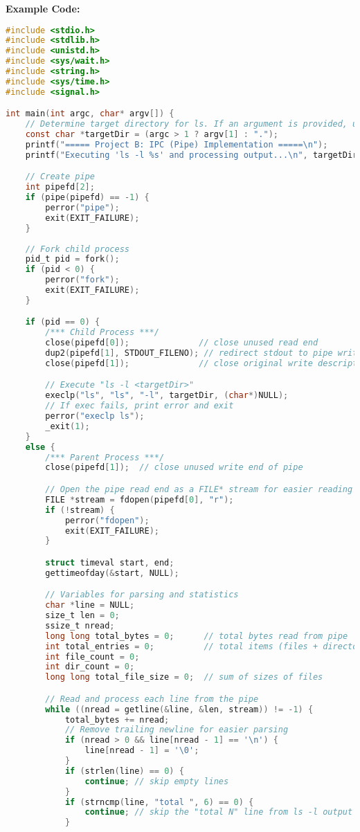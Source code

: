 \documentclass[11pt]{article}
\begin{document}
\textbf{Example Code:}
\begin{lstlisting}[language=C]
#include <stdio.h>
#include <stdlib.h>
#include <unistd.h>
#include <sys/wait.h>
#include <string.h>
#include <sys/time.h>
#include <signal.h>

int main(int argc, char* argv[]) {
    // Determine target directory for ls. If an argument is provided, use it; otherwise use current directory.
    const char *targetDir = (argc > 1 ? argv[1] : ".");
    printf("===== Project B: IPC (Pipe) Implementation =====\n");
    printf("Executing 'ls -l %s' and processing output...\n", targetDir);

    // Create pipe
    int pipefd[2];
    if (pipe(pipefd) == -1) {
        perror("pipe");
        exit(EXIT_FAILURE);
    }
    
    // Fork child process
    pid_t pid = fork();
    if (pid < 0) {
        perror("fork");
        exit(EXIT_FAILURE);
    }

    if (pid == 0) {
        /*** Child Process ***/
        close(pipefd[0]);              // close unused read end
        dup2(pipefd[1], STDOUT_FILENO); // redirect stdout to pipe write end
        close(pipefd[1]);              // close original write descriptor

        // Execute "ls -l <targetDir>"
        execlp("ls", "ls", "-l", targetDir, (char*)NULL);
        // If exec fails, print error and exit
        perror("execlp ls");
        _exit(1);
    } 
    else {
        /*** Parent Process ***/
        close(pipefd[1]);  // close unused write end of pipe

        // Open the pipe read end as a FILE* stream for easier reading
        FILE *stream = fdopen(pipefd[0], "r");
        if (!stream) {
            perror("fdopen");
            exit(EXIT_FAILURE);
        }

        struct timeval start, end;
        gettimeofday(&start, NULL);

        // Variables for parsing and statistics
        char *line = NULL;
        size_t len = 0;
        ssize_t nread;
        long long total_bytes = 0;      // total bytes read from pipe
        int total_entries = 0;          // total items (files + directories)
        int file_count = 0;
        int dir_count = 0;
        long long total_file_size = 0;  // sum of sizes of files

        // Read and process each line from the pipe
        while ((nread = getline(&line, &len, stream)) != -1) {
            total_bytes += nread;
            // Remove trailing newline for easier parsing
            if (nread > 0 && line[nread - 1] == '\n') {
                line[nread - 1] = '\0';
            }
            if (strlen(line) == 0) {
                continue; // skip empty lines
            }
            if (strncmp(line, "total ", 6) == 0) {
                continue; // skip the "total N" line from ls -l output
            }


\end{lstlisting}
\end{document}
